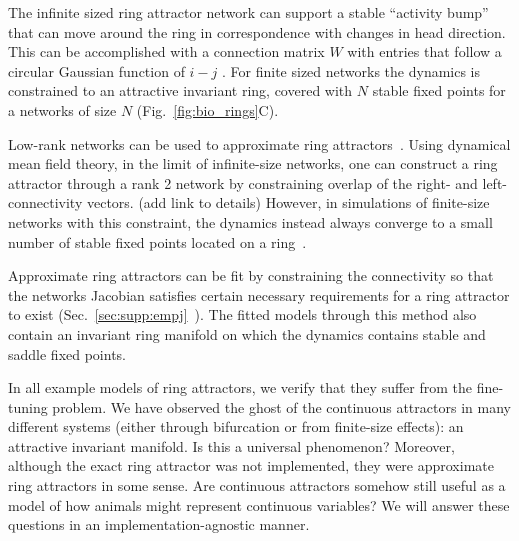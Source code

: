 \documentclass{article} %
\newcommand{\mpcomment}[1]{\textcolor{mpcolor}{(#1)}}
\newcounter{ct}
\theoremstyle{definition}
\theoremstyle{remark}
\begin{document}

The infinite sized ring attractor network can support a stable ``activity bump'' that can move around the ring in correspondence with changes in head direction.
This can be accomplished with a connection matrix $W$ with entries that follow a circular Gaussian function of $i-j$ \citep{seeholzer2017efficient,redish1996coupled,goodridge2000,compte2000synaptic}.
For finite sized networks the dynamics is constrained to an attractive invariant ring, covered with $N$ stable fixed points for a networks of size $N$ (Fig.~\ref{fig:bio_rings}C).
%

Low-rank networks can be used to approximate ring attractors~\citep{mastrogiuseppe2018, beiran2021}.
Using dynamical mean field theory, in the limit of infinite-size networks, one can construct a ring attractor through a rank 2 network by constraining overlap of the right- and left-connectivity vectors. \mpcomment{add link to details}
However, in simulations of finite-size networks with this constraint, the dynamics instead always converge to a small number of stable fixed points located on a ring~\citep{mastrogiuseppe2018}.

Approximate ring attractors can be fit by constraining the connectivity so that the networks Jacobian satisfies certain necessary requirements for a ring attractor to exist (Sec.~\ref{sec:supp:empj}~\citep{pollock2020}).
The fitted models through this method also contain an invariant ring manifold on which the dynamics contains stable and saddle fixed points.

In all example models of ring attractors, we verify that they suffer from the fine-tuning problem.
We have observed the ghost of the continuous attractors in many different systems (either through bifurcation or from finite-size effects): an attractive invariant manifold.
Is this a universal phenomenon?
Moreover, although the exact ring attractor was not implemented, they were approximate ring attractors in some sense.
Are continuous attractors somehow still useful as a model of how animals might represent continuous variables?
We will answer these questions in an implementation-agnostic manner.
\end{document}
